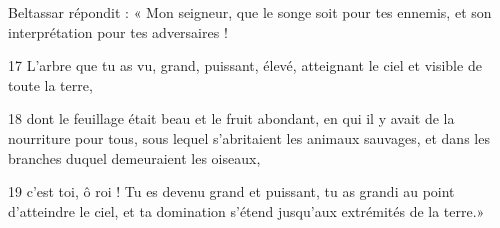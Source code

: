 Beltassar répondit : « Mon seigneur, que le songe soit pour tes ennemis, et son interprétation pour tes adversaires !

17 L’arbre que tu as vu, grand, puissant, élevé, atteignant le ciel et visible de toute la terre,

18 dont le feuillage était beau et le fruit abondant, en qui il y avait de la nourriture pour tous, sous lequel s’abritaient les animaux sauvages, et dans les branches duquel demeuraient les oiseaux,

19 c’est toi, ô roi ! Tu es devenu grand et puissant, tu as grandi au point d’atteindre le ciel, et ta domination s’étend jusqu’aux extrémités de la terre.»
